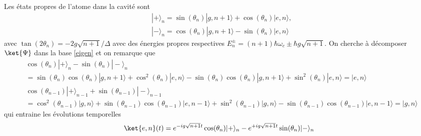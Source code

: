     Les états propres de l'atome dans la cavité sont 
    \begin{align}
            &|+\rangle_n=\sin (\theta_n)|g, n+1\rangle+\cos(\theta_n)|e, n\rangle, \nonumber \\
            &|-\rangle_n=\cos (\theta_n)|g, n+1\rangle-\sin(\theta_n)|e, n\rangle \label{eigen}
    \end{align}
    avec $\tan(2 \theta_n) = -2 g \sqrt{n+1}/\Delta$ avec des énergies propres respectives $E_n^{\pm}=(n+1) \hbar \omega_c \pm \hbar g \sqrt{n+1}$. On cherche à décomposer $\ket{\Psi}$ dans la base \eqref{eigen} et on remarque que 
    \begin{align*}
        &\cos(\theta_n)|+\rangle_n - \sin(\theta_n)|-\rangle_n \nonumber\\&= \sin(\theta_n)\cos(\theta_n)|g, n+1\rangle+\cos^2(\theta_n)|e, n\rangle - \sin(\theta_n)\cos(\theta_n)|g, n+1\rangle+\sin^2(\theta_n)|e, n\rangle = |e, n\rangle\nonumber\\
        &\cos(\theta_{n-1})|+\rangle_{n-1} + \sin(\theta_{n-1})|-\rangle_{n-1}\nonumber\\ &= \cos^2(\theta_{n-1}) |g, n\rangle+\sin(\theta_{n-1})\cos(\theta_{n-1})|e, n-1\rangle + \sin^2(\theta_{n-1})|g, n\rangle-\sin(\theta_{n-1})\cos(\theta_{n-1})|e, n-1\rangle = |g, n\rangle
    \end{align*}
    qui entraine les évolutions temporelles
    \begin{align}
        \ket{e, n}(t) = e^{-i g \sqrt{n+1} t} \cos(\theta_n) |+\rangle_n - e^{+i g \sqrt{n+1} t}\sin(\theta_n)|-\rangle_n
    \end{align}